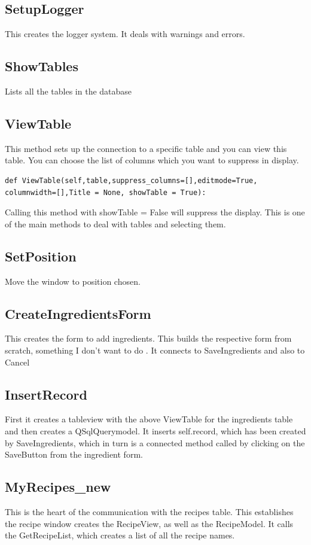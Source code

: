 \documentclass[12pt]{article}
\begin{document}
\subsection{SetupLogger}
This creates the logger system. It deals with warnings and errors.

\subsection{ShowTables}
Lists all the tables in the database

\subsection{ViewTable}
This method sets up the connection to a specific table and you can view this table. You can choose the list of columns which you want to suppress in display.
\begin{verbatim}
def ViewTable(self,table,suppress_columns=[],editmode=True, 
columnwidth=[],Title = None, showTable = True):
\end{verbatim}
Calling this method with showTable = False will suppress the display. This is one of the main methods to deal with tables and selecting them.

\subsection{SetPosition}
Move the window to position chosen.

\subsection{CreateIngredientsForm}
This creates the form to add ingredients. This builds the respective form from scratch, something I don't want to do .
It connects to SaveIngredients and also to Cancel

\subsection{InsertRecord}
First it creates a tableview with the above ViewTable for the ingredients table and then creates a QSqlQuerymodel. It inserts self.record, which has been created by SaveIngredients, which in turn is a connected method called by clicking on the SaveButton from the ingredient form.

\subsection{MyRecipes\_new}
This is the heart of the communication with the recipes table. This establishes the recipe window creates the RecipeView, as well as the RecipeModel. It calls the GetRecipeList, which creates a list of all the recipe names.
\end{document}
